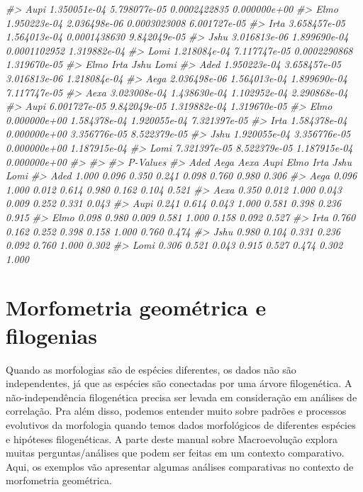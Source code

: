 \documentclass[
]{book}
\newenvironment{Shaded}{\begin{snugshade}}{\end{snugshade}}
\newcommand{\CommentTok}[1]{\textcolor[rgb]{0.56,0.35,0.01}{\textit{#1}}}
\begin{document}
\begin{Shaded}
\begin{Highlighting}[]
\CommentTok{\#\textgreater{} Aupi 1.350051e{-}04 5.798077e{-}05 0.0002422835 0.000000e+00}
\CommentTok{\#\textgreater{} Elmo 1.950223e{-}04 2.036498e{-}06 0.0003023008 6.001727e{-}05}
\CommentTok{\#\textgreater{} Irta 3.658457e{-}05 1.564013e{-}04 0.0001438630 9.842049e{-}05}
\CommentTok{\#\textgreater{} Jshu 3.016813e{-}06 1.899690e{-}04 0.0001102952 1.319882e{-}04}
\CommentTok{\#\textgreater{} Lomi 1.218084e{-}04 7.117747e{-}05 0.0002290868 1.319670e{-}05}
\CommentTok{\#\textgreater{}              Elmo         Irta         Jshu         Lomi}
\CommentTok{\#\textgreater{} Aded 1.950223e{-}04 3.658457e{-}05 3.016813e{-}06 1.218084e{-}04}
\CommentTok{\#\textgreater{} Aega 2.036498e{-}06 1.564013e{-}04 1.899690e{-}04 7.117747e{-}05}
\CommentTok{\#\textgreater{} Aexa 3.023008e{-}04 1.438630e{-}04 1.102952e{-}04 2.290868e{-}04}
\CommentTok{\#\textgreater{} Aupi 6.001727e{-}05 9.842049e{-}05 1.319882e{-}04 1.319670e{-}05}
\CommentTok{\#\textgreater{} Elmo 0.000000e+00 1.584378e{-}04 1.920055e{-}04 7.321397e{-}05}
\CommentTok{\#\textgreater{} Irta 1.584378e{-}04 0.000000e+00 3.356776e{-}05 8.522379e{-}05}
\CommentTok{\#\textgreater{} Jshu 1.920055e{-}04 3.356776e{-}05 0.000000e+00 1.187915e{-}04}
\CommentTok{\#\textgreater{} Lomi 7.321397e{-}05 8.522379e{-}05 1.187915e{-}04 0.000000e+00}
\CommentTok{\#\textgreater{} }
\CommentTok{\#\textgreater{} }
\CommentTok{\#\textgreater{} P{-}Values}
\CommentTok{\#\textgreater{}       Aded  Aega  Aexa  Aupi  Elmo  Irta  Jshu  Lomi}
\CommentTok{\#\textgreater{} Aded 1.000 0.096 0.350 0.241 0.098 0.760 0.980 0.306}
\CommentTok{\#\textgreater{} Aega 0.096 1.000 0.012 0.614 0.980 0.162 0.104 0.521}
\CommentTok{\#\textgreater{} Aexa 0.350 0.012 1.000 0.043 0.009 0.252 0.331 0.043}
\CommentTok{\#\textgreater{} Aupi 0.241 0.614 0.043 1.000 0.581 0.398 0.236 0.915}
\CommentTok{\#\textgreater{} Elmo 0.098 0.980 0.009 0.581 1.000 0.158 0.092 0.527}
\CommentTok{\#\textgreater{} Irta 0.760 0.162 0.252 0.398 0.158 1.000 0.760 0.474}
\CommentTok{\#\textgreater{} Jshu 0.980 0.104 0.331 0.236 0.092 0.760 1.000 0.302}
\CommentTok{\#\textgreater{} Lomi 0.306 0.521 0.043 0.915 0.527 0.474 0.302 1.000}
\end{Highlighting}
\end{Shaded}

\chapter{Morfometria geométrica e filogenias}\label{morfometria-geomuxe9trica-e-filogenias}

Quando as morfologias são de espécies diferentes, os dados não são independentes, já que as espécies são conectadas por uma árvore filogenética.
A não-independência filogenética precisa ser levada em consideração em análises de correlação.
Pra além disso, podemos entender muito sobre padrões e processos evolutivos da morfologia quando temos dados morfológicos de diferentes espécies e hipóteses filogenéticas.
A parte deste manual sobre Macroevolução explora muitas perguntas/análises que podem ser feitas em um contexto comparativo.
Aqui, os exemplos vão apresentar algumas análises comparativas no contexto de morfometria geométrica.
\end{document}
